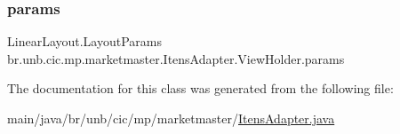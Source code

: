\subsubsection{\texorpdfstring{params}{params}}
{\footnotesize\ttfamily Linear\+Layout.\+Layout\+Params br.\+unb.\+cic.\+mp.\+marketmaster.\+Itens\+Adapter.\+View\+Holder.\+params\hspace{0.3cm}{\ttfamily [package]}}



The documentation for this class was generated from the following file\+:\begin{DoxyCompactItemize}
\item 
main/java/br/unb/cic/mp/marketmaster/\mbox{\hyperlink{ItensAdapter_8java}{Itens\+Adapter.\+java}}\end{DoxyCompactItemize}
